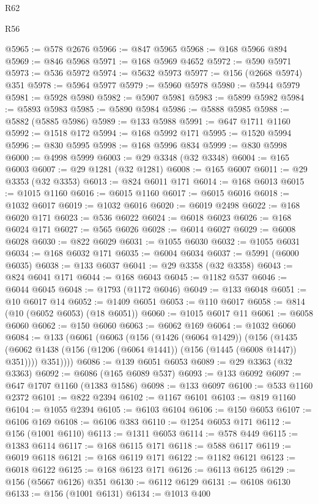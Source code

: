 \begin{lexlean}{R62}
\begin{lexlean}{R56}
\begin{coremodule}
{{{{{{{{{{{{{{{{{{{{{{{{{{{{{{{{{{{{{{{{{{{{{{{{{{{{{{{{{{{{{{{{{{{{{{{{{{{{{{{{{{{{{{{{{{{{{{{{{{{{{{{{{{{{{{{{{{{{{{{{{{{{{{{{{{{{{{{{{{{{{{{{{{{{{{{{{{{{{{{{{{{{{{{{{{{{{{{{{{{{{{{{{{{{{{{{{{{{{{{{{{{{{{{{{{{@5965 := @578 @2676
@5966 := @847 @5965
@5968 := @168 @5966 @894
@5969 := @846 @5968
@5971 := @168 @5969 @4652
@5972 := @590 @5971
@5973 := @536 @5972
@5974 := @5632 @5973
@5977 := @156 (@2668 @5974) @351
@5978 := @5964 @5977
@5979 := @5960 @5978
@5980 := @5944 @5979
@5981 := @5928 @5980
@5982 := @5907 @5981
@5983 := @5899 @5982
@5984 := @5893 @5983
@5985 := @5890 @5984
@5986 := @5888 @5985
@5988 := @5882 (@5885 @5986)
@5989 := @133 @5988
@5991 := @647 @1711 @1160
@5992 := @1518 @172
@5994 := @168 @5992 @171
@5995 := @1520 @5994
@5996 := @830 @5995
@5998 := @168 @5996 @834
@5999 := @830 @5998
@6000 := @4998 @5999
@6003 := @29 @3348 (@32 @3348)
@6004 := @165 @6003
@6007 := @29 @1281 (@32 @1281)
@6008 := @165 @6007
@6011 := @29 @3353 (@32 @3353)
@6013 := @824 @6011 @171
@6014 := @168 @6013
@6015 := @1015 @1160
@6016 := @6015 @1160
@6017 := @6015 @6016
@6018 := @1032 @6017
@6019 := @1032 @6016
@6020 := @6019 @2498
@6022 := @168 @6020 @171
@6023 := @536 @6022
@6024 := @6018 @6023
@6026 := @168 @6024 @171
@6027 := @565 @6026
@6028 := @6014 @6027
@6029 := @6008 @6028
@6030 := @822 @6029
@6031 := @1055 @6030
@6032 := @1055 @6031
@6034 := @168 @6032 @171
@6035 := @6004 @6034
@6037 := @5991 (@6000 @6035)
@6038 := @133 @6037
@6041 := @29 @3358 (@32 @3358)
@6043 := @824 @6041 @171
@6044 := @168 @6043
@6045 := @1182 @537
@6046 := @6044 @6045
@6048 := @1793 (@1172 @6046)
@6049 := @133 @6048
@6051 := @10 @6017 @14
@6052 := @1409 @6051
@6053 := @110 @6017
@6058 := @814 (@10 (@6052 @6053) (@18 @6051))
@6060 := @1015 @6017 @11
@6061 := @6058 @6060
@6062 := @150 @6060
@6063 := @6062 @169
@6064 := @1032 @6060
@6084 := @133
    (@6061
      (@6063
        (@156
          (@1426 (@6064 @1429))
          (@156
            (@1435 (@6062 @1438 (@156 (@1206 (@6064 @1441)) (@156 (@1445 (@6008 @1447)) @351))))
            @351))))
@6086 := @139 @6051 @6053
@6089 := @29 @3363 (@32 @3363)
@6092 := @6086 (@165 @6089 @537)
@6093 := @133 @6092
@6097 := @647 @1707 @1160 (@1383 @1586)
@6098 := @133 @6097
@6100 := @533 @1160 @2372
@6101 := @822 @2394
@6102 := @1167 @6101
@6103 := @819 @1160
@6104 := @1055 @2394
@6105 := @6103 @6104
@6106 := @150 @6053
@6107 := @6106 @169
@6108 := @6106 @383
@6110 := @1254 @6053 @171
@6112 := @156 (@1001 @6110)
@6113 := @1311 @6053
@6114 := @578 @449
@6115 := @1383 @6114
@6117 := @168 @6115 @171
@6118 := @588 @6117
@6119 := @6019 @6118
@6121 := @168 @6119 @171
@6122 := @1182 @6121
@6123 := @6018 @6122
@6125 := @168 @6123 @171
@6126 := @6113 @6125
@6129 := @156 (@5667 @6126) @351
@6130 := @6112 @6129
@6131 := @6108 @6130
@6133 := @156 (@1001 @6131)
@6134 := @1013 @400
}}}}}}}}}}}}}}}}}}}}}}}}}}}}}}}}}}}}}}}}}}}}}}}}}}}}}}}}}}}}}}}}}}}}}}}}}}}}}}}}}}}}}}}}}}}}}}}}}}}}}}}}}}}}}}}}}}}}}}}}}}}}}}}}}}}}}}}}}}}}}}}}}}}}}}}}}}}}}}}}}}}}}}}}}}}}}}}}}}}}}}}}}}}}}}}}}}}}}}}}}}}}}}}}}}}
\end{coremodule}
\end{lexlean}
\end{lexlean}
